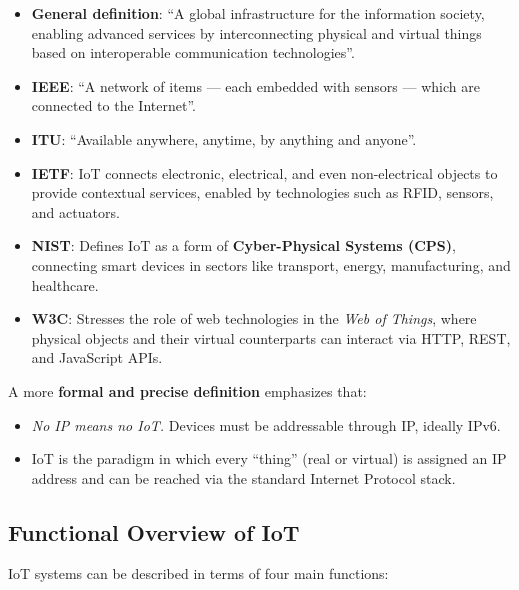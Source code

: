 \begin{itemize}
    \item \textbf{General definition}: ``A global infrastructure for the information society, enabling advanced services by interconnecting physical and virtual things based on interoperable communication technologies''.
    
    \item \textbf{IEEE}: ``A network of items --- each embedded with sensors --- which are connected to the Internet''.
    
    \item \textbf{ITU}: ``Available anywhere, anytime, by anything and anyone''.
    
    \item \textbf{IETF}: IoT connects electronic, electrical, and even non-electrical objects to provide contextual services, enabled by technologies such as RFID, sensors, and actuators.
    
    \item \textbf{NIST}: Defines IoT as a form of \textbf{Cyber-Physical Systems (CPS)}, connecting smart devices in sectors like transport, energy, manufacturing, and healthcare.
    
    \item \textbf{W3C}: Stresses the role of web technologies in the \textit{Web of Things}, where physical objects and their virtual counterparts can interact via HTTP, REST, and JavaScript APIs.
\end{itemize}

A more \textbf{formal and precise definition} emphasizes that:

\begin{itemize}
    \item \textit{No IP means no IoT.} Devices must be addressable through IP, ideally IPv6.
    
    \item IoT is the paradigm in which every ``thing'' (real or virtual) is assigned an IP address and can be reached via the standard Internet Protocol stack.
\end{itemize}

\subsection{Functional Overview of IoT}

IoT systems can be described in terms of four main functions:


